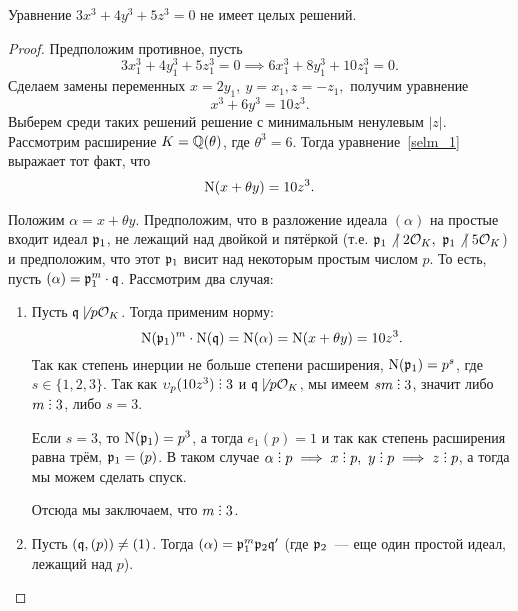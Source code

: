 	 	\begin{theorem} 
	 		Уравнение $3x^3 + 4y^3 + 5z^3 = 0$ не имеет целых решений. 
	 	\end{theorem}
	 	\begin{proof}
	 		Предположим противное, пусть 
	 		\[
	 			3x_1^3 + 4y_1^3 + 5z_1^3 = 0 \implies 6x_1^3 + 8 y_1^3 + 10 z_1^3 = 0.
	 		\]
	 		Сделаем замены переменных $x = 2y_1, \ y = x_1, z = -z_1,$ получим уравнение 
	 		\begin{equation}
	 			x^3 + 6y^3 = 10z^3. \label{selm_1}
	 		\end{equation}
	 		Выберем среди таких решений решение с минимальным ненулевым $|z|$. Рассмотрим расширение $K = \mathbb{Q}(\theta)$, где $\theta^3 = 6$. Тогда уравнение~\ref{selm_1} выражает тот факт, что 
	 		\begin{equation}
	 			\operatorname{\mathrm{N}}(x + \theta y) = 10z^3. 
	 		\end{equation}

	 		Положим $\alpha = x + \theta y$. Предположим, что в разложение идеала $(\alpha)$ на простые входит идеал $\mathfrak{p}_1$, не лежащий над двойкой и пятёркой (т.е. $\mathfrak{p}_1 \not \ \mid 2\mathcal{O}_K, \ \mathfrak{p}_1 \not \ \mid 5\mathcal{O}_K$) и предположим, что этот $\mathfrak{p}_1$ висит над некоторым простым числом $p$. То есть, пусть $(\alpha) = \mathfrak{p}_1^m \cdot \mathfrak{q}$.  Рассмотрим два случая: 

	 		\begin{enumerate}
	 		 	\item Пусть $\mathfrak{q} \not \mid p\mathcal{O}_K$. Тогда применим норму: 
	 		 	\[
	 		 		\operatorname{\mathrm{N}}(\mathfrak{p}_1)^m \cdot \operatorname{\mathrm{N}}(\mathfrak{q}) = \operatorname{\mathrm{N}}(\alpha) = \operatorname{\mathrm{N}}(x + \theta y) = 10z^3.
	 		 	\]
	 		 	Так как степень инерции не больше степени расширения, $\operatorname{\mathrm{N}}(\mathfrak{p}_1) = p^s$, где $s \in \{1, 2, 3\}$. Так как $\v_{p}(10z^3) \divby 3$ и $\mathfrak{q} \not \mid p\mathcal{O}_K$, мы имеем $sm \divby 3$, значит либо $m \divby 3$, либо $s = 3$. 
 		 		
 		 		Если $s = 3$, то $\operatorname{\mathrm{N}}(\mathfrak{p}_1) = p^3$, а тогда $e_{1}(p) = 1$ и так как степень расширения равна трём, $\mathfrak{p}_1 = (p)$. В таком случае $\alpha \divby p \implies x \divby p, \ y \divby p \implies z \divby p$, а тогда мы можем сделать спуск. 

 		 		Отсюда мы заключаем, что $m \divby 3$. 

 		 		\item Пусть $(\mathfrak{q}, (p)) \neq (1)$. Тогда $(\alpha) = \mathfrak{p}_1^m \mathfrak{p}_2 \mathfrak{q}'$ (где $\mathfrak{p}_2$~--- еще один простой идеал, лежащий над $p$). 


\end{enumerate}
\end{proof}

